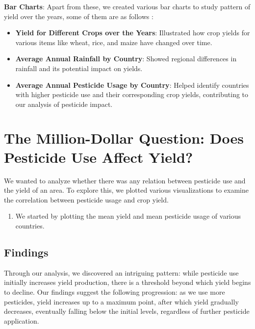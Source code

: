 \documentclass[10pt,twocolumn,letterpaper]{article}
\begin{document}
     \textbf{Bar Charts}:
    Apart from these, we created various bar charts to study pattern of yield over the years, some of them are as follows :
        \begin{itemize}
            \item \textbf{Yield for Different Crops over the Years}: Illustrated how crop yields for various items like wheat, rice, and maize have changed over time.
            \item \textbf{Average Annual Rainfall by Country}: Showed regional differences in rainfall and its potential impact on yields.
            \item \textbf{Average Annual Pesticide Usage by Country}: Helped identify countries with higher pesticide use and their corresponding crop yields, contributing to our analysis of pesticide impact.
        \end{itemize}

\section*{\textbf{The Million-Dollar Question: Does Pesticide Use Affect Yield?}}
We wanted to analyze whether there was any relation between pesticide use and the yield of an area. To explore this, we plotted various visualizations to examine the correlation between pesticide usage and crop yield.

\begin{enumerate}
    \item We started by plotting the mean yield and mean pesticide usage of various countries.
\end{enumerate}


\subsection{Findings}
Through our analysis, we discovered an intriguing pattern: while pesticide use initially increases yield production, there is a threshold beyond which yield begins to decline. Our findings suggest the following progression: as we use more pesticides, yield increases up to a maximum point, after which yield gradually decreases, eventually falling below the initial levels, regardless of further pesticide application.
\end{document}
